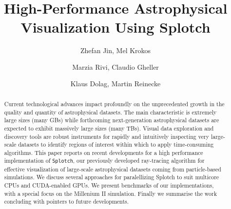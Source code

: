 

\title{High-Performance Astrophysical Visualization Using Splotch}


\author{Zhefan Jin, Mel Krokos}
\address{School of Creative Technologies, University of Portsmouth, Winston Churchill Avenue, Portsmouth, United Kingdom}

\author{Marzia Rivi, Claudio Gheller}
\address{CINECA, Via Magnanelli 6/3, Casalecchio di Reno, Italy}

\author{Klaus Dolag, Martin Reinecke}
\address{Max-Planck-Institut f\"ur Astrophysik, Karl-Schwarzschild Strasse 1, Garching bei M\"unchen, Germany}

%
%

\begin{abstract}

Current technological advances impact profoundly on the unprecedented growth 
in the quality and quantity of astrophysical datasets. The main characteristic 
is extremely large sizes (many GBs) while forthcoming next-generation astrophysical 
datasets are expected to exhibit massively large sizes (many TBs). Visual data 
exploration and discovery tools are robust instruments for rapidly and intuitively 
inspecting very large-scale datasets to identify regions of interest within 
which to apply time-consuming algorithms.  This paper reports on recent developments 
for a high performance implementation of {\tt Splotch}, our previously developed 
ray-tracing algorithm for effective visualization of large-scale astrophysical 
datasets coming from particle-based simulations. We discuss several approaches for 
paralellizing Splotch to suit multicore CPUs and CUDA-enabled GPUs. 
We present benchmarks of our implementations, with a special focus on the 
Millenium II simulation. Finally we summarise the work concluding with pointers 
to future developments.

\end{abstract}

